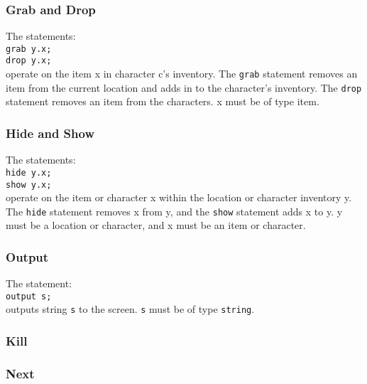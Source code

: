 \documentclass[12pt]{article}
\begin{document}
\subsubsection{Grab and Drop}
The statements: \\

\texttt{grab y.x;} \\
\indent \texttt{drop y.x;} \\

\noindent operate on the item x in character c's inventory.  The \texttt{grab} statement removes an item from the current location and adds in to the character's inventory.  The \texttt{drop} statement removes an item from the characters.  x must be of type item.

\subsubsection{Hide and Show}
The statements:\\

\texttt{hide y.x;} \\
\indent \texttt{show y.x;} \\

\noindent operate on the item or character x within the location or character inventory y.  The \texttt{hide} statement removes x from y, and the \texttt{show} statement adds x to y.  y must be a location or character, and x must be an item or character.

\noindent

\subsubsection{Output}
The statement: \\

\texttt{output s;} \\

\noindent outputs string \texttt{s} to the screen.  \texttt{s} must be of type \texttt{string}.

\subsubsection{Kill}
\subsubsection{Next}
\end{document}
